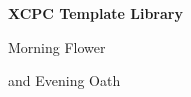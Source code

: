 
\makeatletter
\renewcommand{\@pnumwidth}{2.5em}
\renewcommand{\@tocrmarg}{3.5em}
\makeatother

\raggedbottom
\hypersetup{pageanchor=false}
\begin{titlepage}
\centering\vspace*{28mm}
{\Huge\bfseries XCPC Template Library\par}
\vspace{14mm}
{\LARGE Morning Flower\par and Evening Oath\par}
\vspace{12mm}{\large Tongji University\par}
\vfill
\end{titlepage}
\hypersetup{pageanchor=true}
\frontmatter\tableofcontents
\mainmatter


\backmatter\printindex

